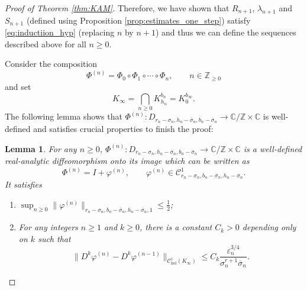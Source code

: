 \documentclass[10pt]{article}
\newtheorem{lemma}[theorem]{Lemma}
\newcommand{\Z}{\mathbb{Z}}
\newcommand{\C}{\mathbb{C}}
\newcommand{\Domain}[3]{D_{#1, #2, #3}}
\begin{document}
\begin{proof}[Proof of Theorem \ref{thm:KAM}]
Therefore, we have shown that $R_{n + 1}$, $\lambda_{n + 1}$ and $S_{n + 1}$ (defined using Proposition \ref{prop:estimates_one_step}) satisfy \eqref{eq:inductiion_hyp} (replacing $n$ by $n + 1$) and thus we can define the sequences described above for all $n \geq 0$.

\vspace{0.2cm}
Consider the composition
\[
\Phi^{(n)} = \Phi_0\circ\Phi_1\circ\cdots\circ\Phi_n,
\qquad n\in\Z_{\geq 0}
\]
and set 
\[
K_{\infty} = \bigcap_{n\geq 0} K_{h_n}^{b_n} = K_0^{b_\infty}.
\]
The following lemma shows that $\Phi^{(n)}:\Domain{r_n-\sigma_n}{h_n-\overline\sigma_n}{b_n-\overline\sigma_n}\to\C/\Z\times\C$ is well-defined and satisfies crucial properties to finish the proof:
\begin{lemma}
    \label{lemma:composition_diffeos}
    For any $n\geq 0$, $\Phi^{(n)}:\Domain{r_n-\sigma_n}{h_n-\overline\sigma_n}{b_n-\overline\sigma_n} \to\C/\Z\times \C$ is a well-defined real-analytic diffeomorphism onto its image which  can be written as
    \[
    \Phi^{(n)} = I + \varphi^{(n)},
    \qquad \varphi^{(n)} \in\mathscr C^1_{r_n-\sigma_n, b_n-\overline\sigma_n, h_n-\overline\sigma_n}.
    \]
    It satisfies
    \begin{enumerate}
        \item $\sup_{n\geq 0} \|\varphi^{(n)}\|_{r_n-\sigma_n, b_n-\overline\sigma_n, h_n-\overline\sigma_n,1}\leq \frac{1}{2}$;
        \item For any integers $n\geq 1$ and $k\geq 0$, there is a constant $C_k>0$ depending only on $k$ such that
        \[
        \|D^k\varphi^{(n)}-D^k\varphi^{(n-1)}\|_{\mathscr C^1_{\text{{hol}}}(K_{\infty})}
        \leq
        C_k\frac{\varepsilon_n^{3/4}}{\sigma_n^{r+1}\overline\sigma_n}.
        \]
    \end{enumerate}
\end{lemma}


\end{proof}
\end{document}
